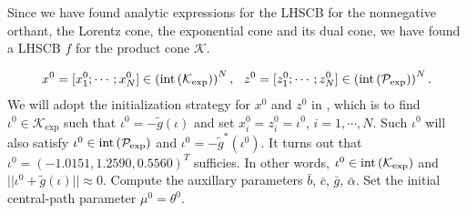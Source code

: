 \documentclass[10pt]{article}
\theoremstyle{definition}
\theoremstyle{plain}
\def\interior{\protect{\textnormal{int}}}
\begin{document}
Since we have found analytic expressions for the LHSCB for the nonnegative orthant, the Lorentz cone, the exponential cone and its dual cone, we have found a LHSCB $f$ for the product cone $\mathcal{K}$.

\begin{align*}
x^0 = [x_1^0;\cdots;x_N^0] \in \left(\interior\left(\mathcal{K}_{\exp}\right)\right)^N,\ \
z^0 = [z_1^0;\cdots; z_N^0] \in \left(\interior\left(\mathcal{P}_{\exp}\right)\right)^N.
\end{align*}
We will adopt the initialization strategy for $x^0$ and $z^0$ in \cite{Akle_thesis}, which is to find $\iota^0 \in \mathcal{K}_{\exp}$ such that $\iota^0 =  -\tilde{g}(\iota)$ and set $x_i^0 = z_i^0 = \iota^0$, $i = 1,\cdots, N$. Such $\iota^0$ will also satisfy $\iota^0 \in \interior \left(\mathcal{P}_{\exp}\right)$ and $\iota^0 = -\tilde{g}^*(\iota^0)$. It turns out that $\iota^0 =   (-1.0151, 1.2590, 0.5560)^T$ sufficies. In other words, $\iota^0 \in \interior \left(\mathcal{K}_{\exp}\right)$ and $||\iota^0 + \tilde{g}(\iota)|| \approx 0$. Compute the auxillary parameters $\bar{b}$, $\bar{c}$, $\bar{g}$, $\bar{\alpha}$. Set the initial central-path parameter $\mu^0 = \theta^0$.
\end{document}
